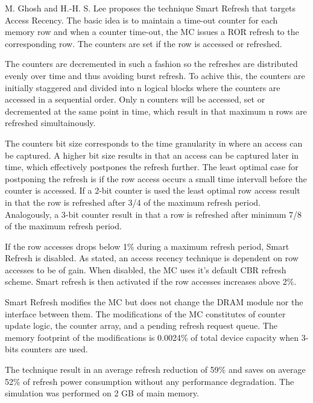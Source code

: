 
M. Ghosh and H.-H. S. Lee proposes the technique Smart Refresh \cite{smartrefresh} that targets Access Recency. The basic idea is to maintain a time-out counter for each memory row and when a counter time-out, the MC issues a ROR refresh to the corresponding row. The counters are set if the row is accessed or refreshed.

The counters are decremented in such a fashion so the refreshes are distributed evenly over time and thus avoiding burst refresh. To achive this, the counters are initially staggered and divided into n logical blocks where the counters are accessed in a sequential order. Only n counters will be accessed, set or decremented at the same point in time, which result in that maximum n rows are refreshed simultainously. 

The counters bit size corresponds to the time granularity in where an access can be captured. A higher bit size results in that an access can be captured later in time, which effectively postpones the refresh further. The least optimal case for postponing the refresh is if the row access occurs a small time intervall before the counter is accessed. If a 2-bit counter is used the least optimal row access result in that the row is refreshed after 3/4 of the maximum refresh period. Analogously, a 3-bit counter result in that a row is refreshed after minimum 7/8 of the maximum refresh period.

If the row accesses drops below 1\% during a maximum refresh period, Smart Refresh is disabled. As stated, an access recency technique is dependent on row accesses to be of gain. When disabled, the MC uses it's default CBR refresh scheme. Smart refresh is then activated if the row accesses increases above 2\%.

Smart Refresh modifies the MC but does not change the DRAM module nor the interface between them. The modifications of the MC constitutes of counter update logic, the counter array, and a pending refresh request queue. The memory footprint of the modifications is 0.0024\% of total device capacity when 3-bits counters are used.

The technique result in an average refresh reduction of 59\% and saves on average 52\% of refresh power consumption without any performance degradation. The simulation was performed on 2 GB of main memory. 